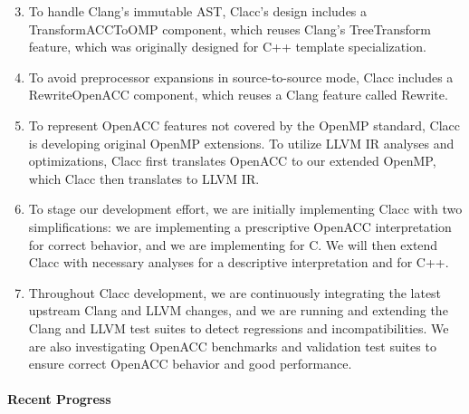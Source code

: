 \vspace{-1em}

\begin{enumerate}

\setcounter{enumi}{2}

\item To handle Clang's immutable AST, Clacc's design includes a
TransformACCToOMP component, which reuses Clang's TreeTransform
feature, which was originally designed for C++ template
specialization.

\item To avoid preprocessor expansions in source-to-source mode, Clacc
includes a RewriteOpenACC component, which reuses a Clang feature
called Rewrite.

\item To represent OpenACC features not covered by the OpenMP
standard, Clacc is developing original OpenMP extensions.  To utilize
LLVM IR analyses and optimizations, Clacc first translates OpenACC to
our extended OpenMP, which Clacc then translates to LLVM IR.

\item To stage our development effort, we are initially implementing
Clacc with two simplifications: we are implementing a prescriptive
OpenACC interpretation for correct behavior, and we are implementing
for C.  We will then extend Clacc with necessary analyses for a
descriptive interpretation and for C++.

\item Throughout Clacc development, we are continuously integrating the
latest upstream Clang and LLVM changes, and we are running and
extending the Clang and LLVM test suites to detect regressions and
incompatibilities.  We are also investigating OpenACC
benchmarks \cite{specAccel} and validation test
suites \cite{openACCValidationSuite} to ensure correct OpenACC
behavior and good performance.

\end{enumerate}


\paragraph{Recent Progress}

